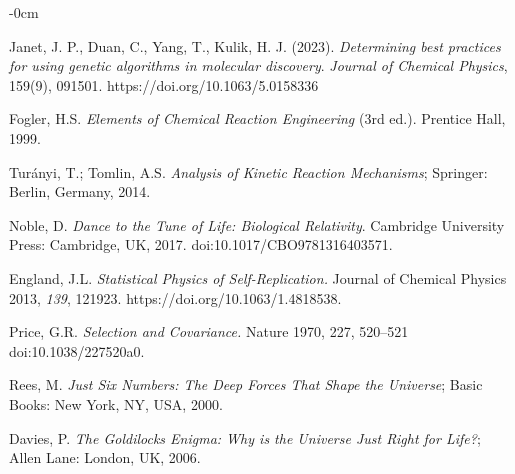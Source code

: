 \documentclass[life,article,submit,pdftex,moreauthors]{Definitions/mdpi}
\begin{document}
\begin{adjustwidth}{-\extralength}{0cm}
{\begin{thebibliography}{999}
Janet, J. P., Duan, C., Yang, T., Kulik, H. J. (2023).
\textit{Determining best practices for using genetic algorithms in molecular discovery}.
\textit{Journal of Chemical Physics}, 159(9), 091501. https://doi.org/10.1063/5.0158336

Fogler, H.S. \textit{Elements of Chemical Reaction Engineering} (3rd ed.). Prentice Hall, 1999.

Turányi, T.; Tomlin, A.S. \textit{Analysis of Kinetic Reaction Mechanisms}; Springer: Berlin, Germany, 2014.

Noble, D. 
\textit{Dance to the Tune of Life: Biological Relativity}. 
Cambridge University Press: Cambridge, UK, 2017. 
doi:10.1017/CBO9781316403571.


England, J.L. 
\textit{Statistical Physics of Self-Replication.} 
Journal of Chemical Physics 2013, \textit{139}, 121923. 
https://doi.org/10.1063/1.4818538.

Price, G.R. \textit{Selection and Covariance.} Nature 1970, 227, 520–521 doi:10.1038/227520a0.

Rees, M. \textit{Just Six Numbers: The Deep Forces That Shape the Universe}; Basic Books: New York, NY, USA, 2000.

Davies, P. \textit{The Goldilocks Enigma: Why is the Universe Just Right for Life?}; Allen Lane: London, UK, 2006.

\end{thebibliography}
}



%



\end{adjustwidth}
\end{document}
